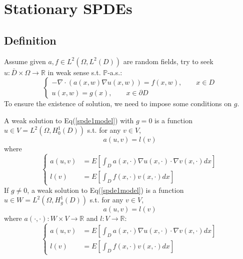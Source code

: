 \section{Stationary SPDEs}
\subsection{Definition}
\begin{definition}
    Assume given $a, f\in L^2(\Omega, L^2(D))$ are random fields, try to seek $u:\bar{D}\times \Omega \to \mathbb{R}$ in weak sense s.t. $\mathbb{P}$-a.s.:
    \begin{equation}\left\{
        \begin{aligned}
            -\nabla \cdot (a(x, w)\nabla u(x, w)) = f(x, w),\qquad x\in D\\
            u(x, w) = g(x),\qquad x\in \partial D
        \end{aligned}\right.\label{spde1model}
    \end{equation}
    To ensure the existence of solution, we need to impose some conditions on $g$.
\end{definition}

\begin{definition}
    A weak solution to Eq(\ref{spde1model}) with $g=0$ is a function $u\in V=L^2(\Omega, H_0^1(D))$ s.t. for any $v\in V$,
    \begin{equation}
        a(u, v) = l(v)\label{spde1weak}
    \end{equation}
    where\begin{equation}\left\{
        \begin{aligned}
            a(u, v) &= E\left[\int_D a(x, \cdot)\nabla u(x, \cdot)\cdot \nabla v(x, \cdot)dx\right]\\
            l(v) &= E\left[\int_D f(x, \cdot)v(x, \cdot)dx\right]
        \end{aligned}\right.
    \end{equation}
    If $g\neq 0$, a weak solution to Eq(\ref{spde1model}) is a function $u\in W=L^2(\Omega, H_g^1(D))$ s.t. for any $v\in V$,
    \begin{equation}
        a(u, v) = l(v)\label{spde1weaknh}
    \end{equation}
    where $a(\cdot, \cdot):W\times V\to \mathbb{R}$ and $l:V\to \mathbb{R}$:
    \begin{equation}\left\{
        \begin{aligned}
            a(u, v) &= E\left[\int_D a(x, \cdot)\nabla u(x, \cdot)\cdot \nabla v(x, \cdot)dx\right]\\
            l(v) &= E\left[\int_D f(x, \cdot)v(x, \cdot)dx\right]
        \end{aligned}\right.
    \end{equation}
\end{definition}

